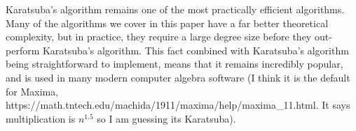 \medskip



Karatsuba's algorithm remains one of the most practically efficient algorithms. Many of the algorithms we cover in this paper have a far better theoretical complexity, but in practice, they require a large degree size before they out-perform Karatsuba's algorithm. This fact combined with Karatsuba's algorithm being straightforward to implement, means that it remains incredibly popular, and is used in many modern computer algebra software (I think it is the default for Maxima, https://math.tntech.edu/machida/1911/maxima/help/maxima\_11.html. It says multiplication is $n^{1.5}$ so I am guessing its Karatsuba).

